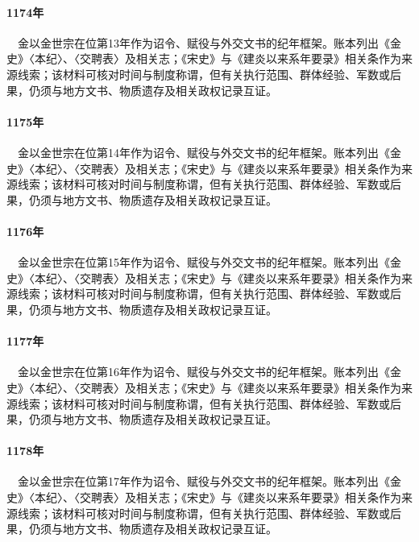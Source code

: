 \paragraph{1174年}　金以金世宗在位第13年作为诏令、赋役与外交文书的纪年框架。账本列出《金史》〈本纪〉、〈交聘表〉及相关志；《宋史》与《建炎以来系年要录》相关条作为来源线索；该材料可核对时间与制度称谓，但有关执行范围、群体经验、军数或后果，仍须与地方文书、物质遗存及相关政权记录互证。

\paragraph{1175年}　金以金世宗在位第14年作为诏令、赋役与外交文书的纪年框架。账本列出《金史》〈本纪〉、〈交聘表〉及相关志；《宋史》与《建炎以来系年要录》相关条作为来源线索；该材料可核对时间与制度称谓，但有关执行范围、群体经验、军数或后果，仍须与地方文书、物质遗存及相关政权记录互证。

\paragraph{1176年}　金以金世宗在位第15年作为诏令、赋役与外交文书的纪年框架。账本列出《金史》〈本纪〉、〈交聘表〉及相关志；《宋史》与《建炎以来系年要录》相关条作为来源线索；该材料可核对时间与制度称谓，但有关执行范围、群体经验、军数或后果，仍须与地方文书、物质遗存及相关政权记录互证。

\paragraph{1177年}　金以金世宗在位第16年作为诏令、赋役与外交文书的纪年框架。账本列出《金史》〈本纪〉、〈交聘表〉及相关志；《宋史》与《建炎以来系年要录》相关条作为来源线索；该材料可核对时间与制度称谓，但有关执行范围、群体经验、军数或后果，仍须与地方文书、物质遗存及相关政权记录互证。

\paragraph{1178年}　金以金世宗在位第17年作为诏令、赋役与外交文书的纪年框架。账本列出《金史》〈本纪〉、〈交聘表〉及相关志；《宋史》与《建炎以来系年要录》相关条作为来源线索；该材料可核对时间与制度称谓，但有关执行范围、群体经验、军数或后果，仍须与地方文书、物质遗存及相关政权记录互证。

